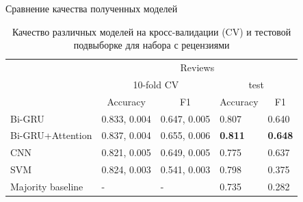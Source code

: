 \documentclass{beamer}
\begin{document}
\begin{frame}{Сравнение качества полученных моделей}
\begin{table}[]
	\centering
	\caption{Качество различных моделей на кросс-валидации (CV) и тестовой подвыборке для набора с рецензиями}
	\begin{tabular}{l|l|l|l|l|}
		\cline{2-5}
		& \multicolumn{4}{c|}{Reviews}                                                                                      \\ \cline{2-5} 
		& \multicolumn{2}{c|}{10-fold CV}                         & \multicolumn{2}{c|}{test}                               \\ \cline{2-5} 
		& \multicolumn{1}{c|}{Accuracy} & \multicolumn{1}{c|}{F1} & \multicolumn{1}{c|}{Accuracy} & \multicolumn{1}{c|}{F1} \\ \hline
		\multicolumn{1}{|l|}{Bi-GRU}            & 0.833, 0.004                  & 0.647, 0.005            & 0.807                         & 0.640                   \\ \hline
		\multicolumn{1}{|l|}{Bi-GRU+Attention}  & 0.837, 0.004                  & 0.655, 0.006            & \textbf{0.811}                         & \textbf{0.648}                   \\ \hline
		\multicolumn{1}{|l|}{CNN}               & 0.821, 0.005                  & 0.649, 0.005            & 0.775                         & 0.637                   \\ \hline
		\multicolumn{1}{|l|}{SVM}               & 0.824, 0.003                  & 0.541, 0.003            & 0.798                         & 0.375                   \\ \hline
		\multicolumn{1}{|l|}{Majority baseline} & -                             & -                       & 0.735                         & 0.282                   \\ \hline
	\end{tabular}
\end{table}

\end{frame}
\end{document}
